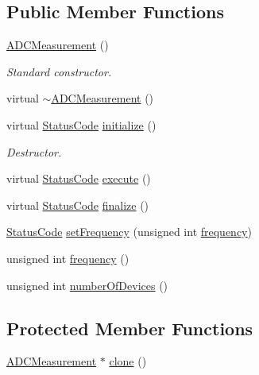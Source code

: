 \subsection*{Public Member Functions}
\begin{DoxyCompactItemize}
\item 
\hyperlink{classADCMeasurement_a93804f658f3aaa78d3ce18199f1bf8e1}{A\+D\+C\+Measurement} ()
\begin{DoxyCompactList}\small\item\em Standard constructor. \end{DoxyCompactList}\item 
virtual \hyperlink{classADCMeasurement_aa89145ed91025783a1bb277cb480ed1c}{$\sim$\+A\+D\+C\+Measurement} ()
\item 
virtual \hyperlink{classStatusCode}{Status\+Code} \hyperlink{classADCMeasurement_a3fc6d3e863fecc7a1caf91f9b0ca5268}{initialize} ()
\begin{DoxyCompactList}\small\item\em Destructor. \end{DoxyCompactList}\item 
virtual \hyperlink{classStatusCode}{Status\+Code} \hyperlink{classADCMeasurement_a82de69f0488646dfc50d28f611e2010d}{execute} ()
\item 
virtual \hyperlink{classStatusCode}{Status\+Code} \hyperlink{classADCMeasurement_a02a5ae7c0f9c90d0dad00c1d40a1c52a}{finalize} ()
\item 
\hyperlink{classStatusCode}{Status\+Code} \hyperlink{classADCMeasurement_a08433e5168f45de1061bf9a17f022f68}{set\+Frequency} (unsigned int \hyperlink{classADCMeasurement_ad3d523331ad64494f2415319a03c638e}{frequency})
\item 
unsigned int \hyperlink{classADCMeasurement_ad3d523331ad64494f2415319a03c638e}{frequency} ()
\item 
unsigned int \hyperlink{classADCMeasurement_a7f91c4feea465de03bd017a005125177}{number\+Of\+Devices} ()
\end{DoxyCompactItemize}
\subsection*{Protected Member Functions}
\begin{DoxyCompactItemize}
\item 
\hyperlink{classADCMeasurement}{A\+D\+C\+Measurement} $\ast$ \hyperlink{classADCMeasurement_a6e34c2b4e3451f1fd128d213723ab1b9}{clone} ()
\end{DoxyCompactItemize}
